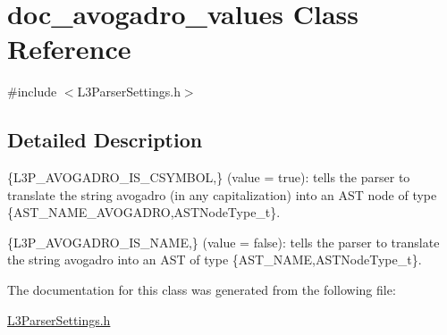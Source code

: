 \hypertarget{classdoc__avogadro__values}{}\section{doc\+\_\+avogadro\+\_\+values Class Reference}
\label{classdoc__avogadro__values}


{\ttfamily \#include $<$L3\+Parser\+Settings.\+h$>$}



\subsection{Detailed Description}

\begin{DoxyItemize}
\item \{L3\+P\+\_\+\+A\+V\+O\+G\+A\+D\+R\+O\+\_\+\+I\+S\+\_\+\+C\+S\+Y\+M\+B\+OL,\} (value = {\ttfamily true})\+: tells the parser to translate the string {\ttfamily avogadro} (in any capitalization) into an A\+ST node of type \{A\+S\+T\+\_\+\+N\+A\+M\+E\+\_\+\+A\+V\+O\+G\+A\+D\+RO,A\+S\+T\+Node\+Type\+\_\+t\}. 
\item \{L3\+P\+\_\+\+A\+V\+O\+G\+A\+D\+R\+O\+\_\+\+I\+S\+\_\+\+N\+A\+ME,\} (value = {\ttfamily false})\+: tells the parser to translate the string {\ttfamily avogadro} into an A\+ST of type \{A\+S\+T\+\_\+\+N\+A\+ME,A\+S\+T\+Node\+Type\+\_\+t\}. 
\end{DoxyItemize}

The documentation for this class was generated from the following file\+:\begin{DoxyCompactItemize}
\item 
\hyperlink{_l3_parser_settings_8h}{L3\+Parser\+Settings.\+h}\end{DoxyCompactItemize}
